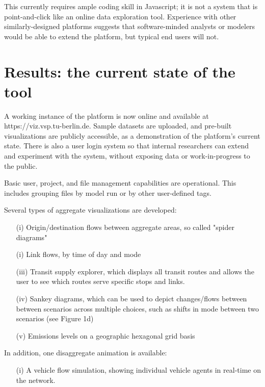 \documentclass[Afour,sagev,times]{sagej}
\begin{document}
This currently requires ample coding skill in Javascript; it is not a system that is point-and-click like an online data exploration tool. Experience with other similarly-designed platforms suggests that software-minded analysts or modelers would be able to extend the platform, but typical end users will not.

\section{Results: the current state of the tool}

A working instance of the platform is now online and available at https://viz.vsp.tu-berlin.de. Sample datasets are uploaded, and pre-built visualizations are publicly accessible, as a demonstration of the platform's current state. There is also a user login system so that internal researchers can extend and experiment with the system, without exposing data or work-in-progress to the public.

Basic user, project, and file management capabilities are operational. This includes grouping files by model run or by other user-defined tags.

Several types of aggregate visualizations are developed:

\begin{enumerate}

\item[(i)] Origin/destination flows between aggregate areas, so called "spider diagrams"
\item[(i)] Link flows, by time of day and mode
\item[(iii)] Transit supply explorer, which displays all transit routes and allows the user to see which routes serve specific stops and links.
\item[(iv)] Sankey diagrams, which can be used to depict changes/flows between between scenarios across multiple choices, such as shifts in mode between two scenarios (see Figure 1d)
\item[(v)] Emissions levels on a geographic hexagonal grid basis

\end{enumerate}

In addition, one disaggregate animation is available:

\begin{enumerate}
\item[(i)] A vehicle flow simulation, showing individual vehicle agents in real-time on the network.
\end{enumerate}
\end{document}
